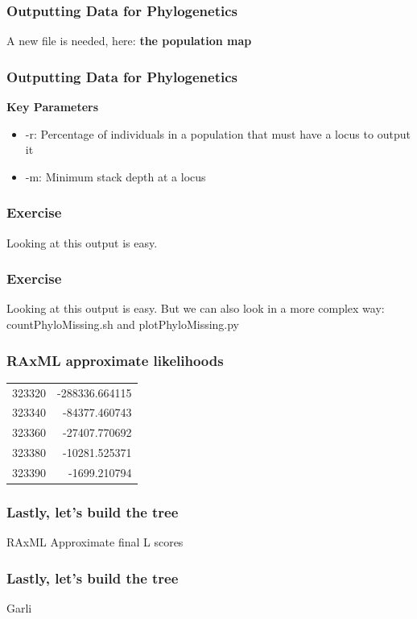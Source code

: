 \documentclass{beamer}
\begin{document}
\begin{frame}
\frametitle{Outputting Data for Phylogenetics}
A new file is needed, here: \textbf{the population map}
\end{frame}

\begin{frame}
\frametitle{Outputting Data for Phylogenetics}
\textbf{Key Parameters}
\begin{itemize}
\item -r: Percentage of individuals in a population that must have a locus to output it
\item -m: Minimum stack depth at a locus
\end{itemize}
\end{frame}

\begin{frame}
\frametitle{Exercise}
Looking at this output is easy.
\end{frame}

\begin{frame}
\frametitle{Exercise}
Looking at this output is easy.
But we can also look in a more complex way: countPhyloMissing.sh and plotPhyloMissing.py
\end{frame}

\begin{frame}
\frametitle{RAxML approximate likelihoods}

\begin{tabular}{ l  | r }
  323320 & -288336.664115  \\
  323340 & -84377.460743 \\
  323360 & -27407.770692\\
  323380 & -10281.525371\\
  323390 & -1699.210794 \\
\end{tabular}
\end{frame}

\begin{frame}
\frametitle{Lastly, let's build the tree}
RAxML Approximate final L scores

\end{frame}

\begin{frame}
\frametitle{Lastly, let's build the tree}
Garli
\end{frame}
\end{document}
